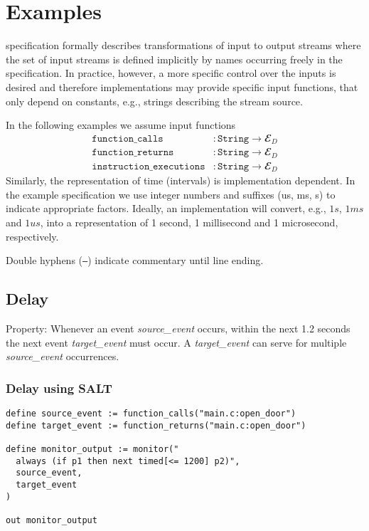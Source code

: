 \section{Examples}

\tessla specification formally describes transformations of input to output streams where the set of input streams is defined implicitly by names occurring freely in the specification. 
In practice, however, a more specific control over the inputs is desired and therefore implementations may provide specific input functions, that only depend on constants, e.g., strings describing the stream source.

In the following examples we assume input functions
\begin{align*}
 \mathtt{function\_calls}&: \mathtt{String} → 𝓔_D\\
 \mathtt{function\_returns}&: \mathtt{String} → 𝓔_D\\
\mathtt{instruction\_executions}&:\mathtt{String} → 𝓔_D
\end{align*}
Similarly, the representation of time (intervals) is implementation dependent.
In the example specification we use integer numbers and suffixes (us, ms, s) to indicate appropriate factors. 
Ideally, an implementation will convert, e.g.,  $1s$, $1ms$ and $1us$, into a representation of 1 second, 1 millisecond and 1 microsecond, respectively.

Double hyphens (\texttt{--}) indicate commentary until line ending.

\subsection{Delay}

Property: Whenever an event \emph{source\_event} occurs, within the next 1.2 seconds the next event \emph{target\_event} must occur.
A \emph{target\_event} can serve for multiple \emph{source\_event} occurrences.

\subsubsection{Delay using SALT}

\begin{lstlisting}[language=tessla+salt]
define source_event := function_calls("main.c:open_door")
define target_event := function_returns("main.c:open_door")

define monitor_output := monitor("
  always (if p1 then next timed[<= 1200] p2)",
  source_event,
  target_event
)

out monitor_output
\end{lstlisting}

